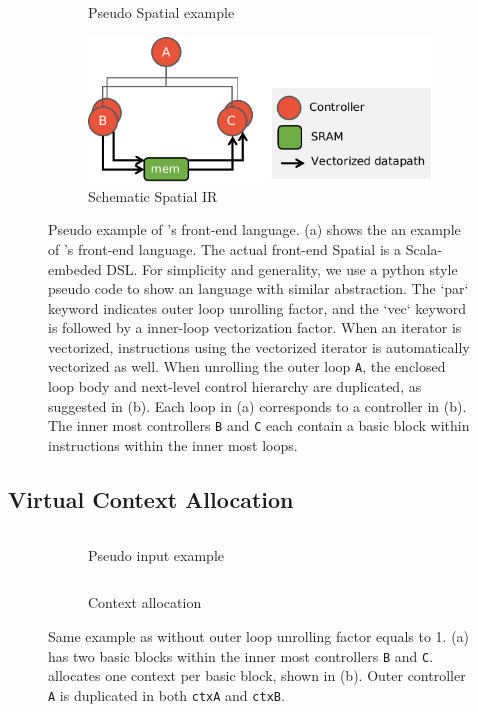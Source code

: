 \begin{figure}
\centering
\begin{subfigure}[b]{0.4\textwidth}
\inputminted{python}{code/spatialegpar.py}
\caption{Pseudo Spatial example}
\end{subfigure}
\hfill
\begin{subfigure}[b]{0.58\textwidth}
\includegraphics[width=1\textwidth]{figs/spatialir.pdf}
\caption{Schematic Spatial IR}
\end{subfigure}
\caption[Spatial Example]{
  Pseudo example of \name's front-end language.
  (a) shows the an example of \name's front-end language. The actual front-end Spatial is a
  Scala-embeded DSL. For simplicity and generality, we use a python style pseudo code to show an
  language with similar abstraction. The `par` keyword indicates outer loop unrolling factor, and
  the `vec` keyword is followed by a inner-loop vectorization factor.
  When an iterator is vectorized, instructions using the vectorized iterator is automatically
  vectorized as well. When unrolling the outer loop \texttt{A}, the enclosed loop body and
  next-level control hierarchy are duplicated, as suggested in (b).
  Each loop in (a) corresponds to a controller in (b). The inner most controllers \texttt{B} and
  \texttt{C} each contain a basic block within instructions within the inner most loops.
}
\label{fig:spatialegpar}
\end{figure}

\subsection{Virtual Context Allocation} 

\begin{figure}
\centering
\begin{subfigure}[b]{0.4\textwidth}
\inputminted{python}{code/spatialeg.py}
\caption{Pseudo input example}
\label{fig:contexteg}
\end{subfigure}
\hfill
\begin{subfigure}[b]{0.5\textwidth}
\inputminted{python}{code/contextalloc.py}
\caption{Context allocation}
\end{subfigure}
  \caption[Context allocation]{Same example as  without outer loop
  unrolling factor equals to 1.
  (a) has two basic blocks within the inner most controllers \texttt{B} and \texttt{C}.
  \name allocates one context per basic block, shown in (b). Outer controller \texttt{A} is
  duplicated in both \texttt{ctxA} and \texttt{ctxB}.
}
\label{fig:contextalloc}
\end{figure}

